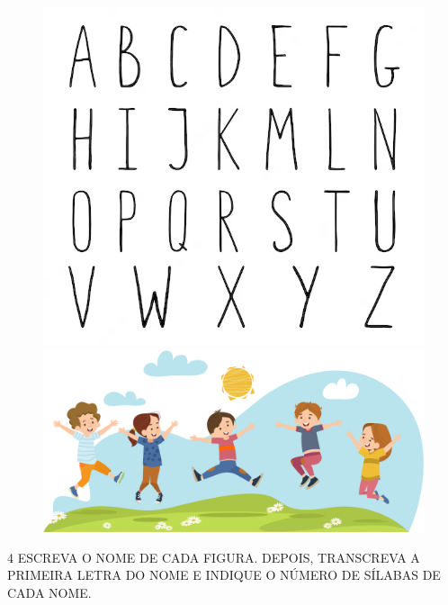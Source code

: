 
\begin{figure}[H]
\centering
\includegraphics[width=\textwidth]{media/image7.png}

\includegraphics[width=\textwidth]{media/image261.png}
\end{figure}

\num{4} ESCREVA O NOME DE CADA FIGURA. DEPOIS, TRANSCREVA A PRIMEIRA LETRA DO NOME E INDIQUE O NÚMERO DE SÍLABAS DE CADA NOME.


